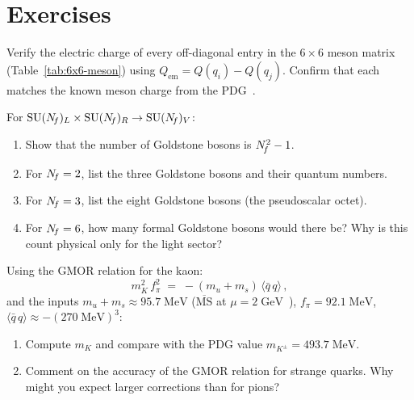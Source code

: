 \documentclass[11pt,a4paper]{article}
\newcommand{\fpi}{f_\pi}
\newcommand{\qqbar}{\langle \bar{q}\,q \rangle}
\begin{document}
\section*{Exercises}

\begin{exercise}
\label{ex:charge}
Verify the electric charge of every off-diagonal entry in the
$6 \times 6$ meson matrix (Table~\ref{tab:6x6-meson}) using
$Q_{\text{em}} = Q(q_i) - Q(q_j)$.  Confirm that each matches the
known meson charge from the PDG~\cite{PDG2024}.
\end{exercise}

\begin{exercise}
\label{ex:goldstone}
For $\mathrm{SU}(N_{\!f})_L \times \mathrm{SU}(N_{\!f})_R \to \mathrm{SU}(N_{\!f})_V$:
\begin{enumerate}[label=(\alph*)]
  \item Show that the number of Goldstone bosons is $N_{\!f}^2 - 1$.
  \item For $N_{\!f} = 2$, list the three Goldstone bosons and their
    quantum numbers.
  \item For $N_{\!f} = 3$, list the eight Goldstone bosons (the
    pseudoscalar octet).
  \item For $N_{\!f} = 6$, how many formal Goldstone bosons would there
    be?  Why is this count physical only for the light sector?
\end{enumerate}
\end{exercise}

\begin{exercise}
\label{ex:gmor-kaon}
Using the GMOR relation for the kaon:
\begin{equation*}
  m_K^2\, \fpi^2 \;=\; -(m_u + m_s)\,\qqbar\,,
\end{equation*}
and the inputs $m_u + m_s \approx 95.7\;\text{MeV}$
($\overline{\text{MS}}$ at $\mu = 2\;\text{GeV}$~\cite{PDG2024}),
$\fpi = 92.1\;\text{MeV}$, $\qqbar \approx -(270\;\text{MeV})^3$:
\begin{enumerate}[label=(\alph*)]
  \item Compute $m_K$ and compare with the PDG value $m_{K^\pm} =
    493.7\;\text{MeV}$.
  \item Comment on the accuracy of the GMOR relation for strange
    quarks.  Why might you expect larger corrections than for pions?
\end{enumerate}
\end{exercise}
\end{document}
